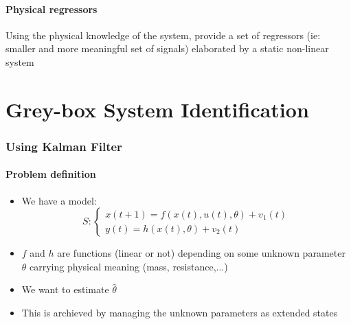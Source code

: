 \documentclass{article}
\let\OldPart\part
\renewcommand{\part}{\newpage\OldPart}
\begin{document}
\subsection{Physical regressors}
Using the physical knowledge of the system, provide a set of regressors (ie: smaller and more meaningful set of signals) elaborated by a static non-linear system
\begin{center}
\end{center}

\part{Grey-box System Identification}
\section{Using Kalman Filter}
\subsection{Problem definition}
\begin{itemize}
\item We have a model:
\[
S:
\begin{cases}
x(t+1)=f(x(t),u(t),\theta)+v_1(t)\\
y(t)=h(x(t),\theta)+v_2(t)
\end{cases}
\]
\item $f$ and $h$ are functions (linear or not) depending on some unknown parameter $\theta$ carrying physical meaning (mass, resistance,...)
\item We want to estimate $\hat{\theta}$
\item This is archieved by managing the unknown parameters as extended states
\end{itemize}
\end{document}
